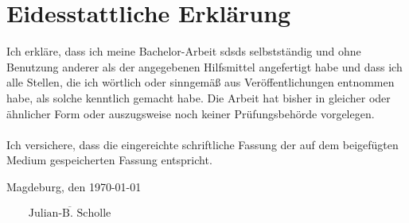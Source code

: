 \chapter*{Eidesstattliche Erklärung}
Ich erkläre, dass ich meine Bachelor-Arbeit sdsds selbstständig und ohne Benutzung anderer als der angegebenen Hilfsmittel angefertigt habe und dass ich alle Stellen, die ich wörtlich oder sinngemäß aus Veröffentlichungen entnommen habe, als solche kenntlich gemacht habe. Die Arbeit hat bisher in gleicher oder ähnlicher Form oder auszugsweise noch keiner Prüfungsbehörde vorgelegen.\\\\

Ich versichere, dass die eingereichte schriftliche Fassung der auf dem beigefügten Medium gespeicherten Fassung entspricht.


\noindent Magdeburg, den \today
\begin{flushright}
$\overline{~~~~~~~~~\mbox{Julian-B. Scholle}~~~~~~~~~}$
\end{flushright}